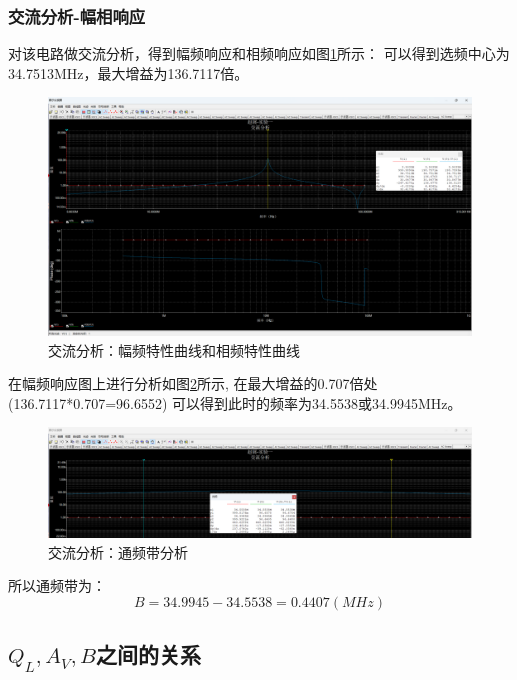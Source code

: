 \documentclass[UTF8]{ctexart}
\begin{document}
\subsubsection{交流分析-幅相响应}
对该电路做交流分析，得到幅频响应和相频响应如图\ref{img:multisim_alternating_analyze}所示：
可以得到选频中心为34.7513MHz，最大增益为136.7117倍。
\begin{figure}[htbp]
    \centering
    \includegraphics[width=0.8\linewidth]{multisim_alternating_analyze.png}
    \caption{交流分析：幅频特性曲线和相频特性曲线}
    \label{img:multisim_alternating_analyze}
\end{figure}
在幅频响应图上进行分析如图\ref{img:multisim_alternating_analysis}所示,
在最大增益的0.707倍处(136.7117*0.707=96.6552)
可以得到此时的频率为34.5538或34.9945MHz。
\begin{figure}[htbp]
    \centering
    \includegraphics[width=0.8\linewidth]{multisim_alternating_analysis.png}
    \caption{交流分析：通频带分析}
    \label{img:multisim_alternating_analysis}
\end{figure}
所以通频带为：
$$
B=34.9945-34.5538=0.4407(MHz)
$$
\subsection{$Q_L,A_V,B$之间的关系}
\end{document}
